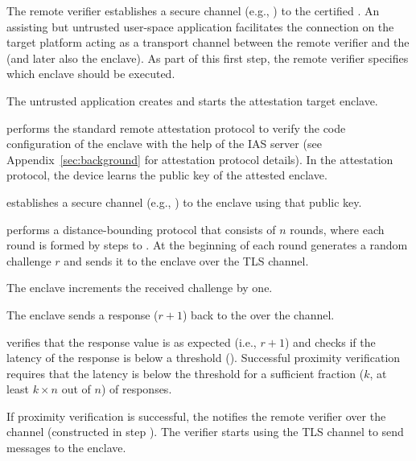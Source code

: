 \begin{mylist}
  \item[\one] The remote verifier establishes a secure channel (e.g., \tls) to the certified \device. An assisting but untrusted user-space application facilitates the connection on the target platform acting as a transport channel between the remote verifier and the \device (and later also the enclave). As part of this first step, the remote verifier specifies which enclave should be executed.

  \item[\two] The untrusted application creates and starts the attestation target enclave.

  \item[\three] \device performs the standard remote attestation protocol to verify the code configuration of the enclave with the help of the IAS server (see Appendix~\ref{sec:background} for attestation protocol details). In the attestation protocol, the device learns the public key of the attested enclave.

  \item[\four] \device establishes a secure channel (e.g., \tls) to the enclave using that public key.

  \item[\five] \device performs a distance-bounding protocol that consists of $n$ rounds, where each round is formed by steps \five to \eight.
  At the beginning of each round \device generates a random challenge $r$ and sends it to the enclave over the TLS channel.

  \item[\six] The enclave increments the received challenge by one.

  \item[\seven] The enclave sends a response ($r+1$) back to the \device over the \tls channel.

  \item[\eight] \device verifies that the response value is as expected (i.e., $r+1$) and checks if the latency of the response is below a threshold (\connect). Successful proximity verification requires that the latency is below the threshold for a sufficient fraction ($k$, at least $k \times n$ out of $n$) of responses.

  \item[\nine] If proximity verification is successful, the \device notifies the remote verifier over the \tls channel (constructed in step \one). The verifier starts using the \device TLS channel to send messages to the enclave.

\end{mylist}



